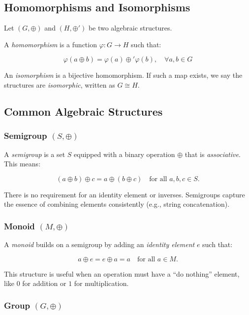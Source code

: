 \subsection{Homomorphisms and Isomorphisms}

Let \((G, \oplus)\) and \((H, \oplus')\) be two algebraic structures.
\vspace{\baselineskip}

A \emph{homomorphism} is a function \(\varphi: G \rightarrow H\) such that:
    
\[
  \varphi(a \oplus b) = \varphi(a) \oplus' \varphi(b), \quad \forall a,b \in G
\]
    
An \emph{isomorphism} is a bijective homomorphism. If such a map exists, we say the structures are \emph{isomorphic}, written as \(G \cong H\).

\subsection{Common Algebraic Structures}

\subsubsection{Semigroup \texorpdfstring{\((S, \oplus)\)}{}}

A \emph{semigroup} is a set \(S\) equipped with a binary operation \(\oplus\) that is \emph{associative}. This means:

\[
  (a \oplus b) \oplus c = a \oplus (b \oplus c) \quad \text{for all } a, b, c \in S.
\]

There is no requirement for an identity element or inverses. Semigroups 
capture the essence of combining elements consistently (e.g., string concatenation).

\subsubsection{Monoid \texorpdfstring{\((M, \oplus)\)}{}}

A \emph{monoid} builds on a semigroup by adding an \emph{identity element} \(e\) such that:

\[
  a \oplus e = e \oplus a = a \quad \text{for all } a \in M.
\]

This structure is useful when an operation must have a “do nothing” element, like \(0\) for addition or \(1\) for multiplication.

\subsubsection{Group \texorpdfstring{\((G, \oplus)\)}{}}

